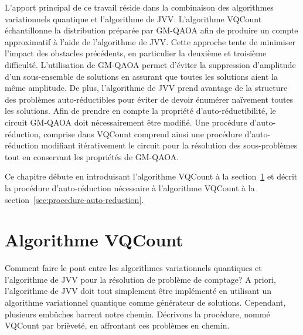 L'apport principal de ce travail réside dans la combinaison des algorithmes variationnels quantique et l'algorithme de JVV. L'algorithme VQCount échantillonne la distribution préparée par GM-QAOA afin de produire un compte approximatif à l'aide de l'algorithme de JVV. Cette approche tente de minimiser l'impact des obstacles précédents, en particulier la deuxième et troisième difficulté. L'utilisation de GM-QAOA permet d'éviter la suppression d'amplitude d'un sous-ensemble de solutions en assurant que toutes les solutions aient la même amplitude. De plus, l'algorithme de JVV prend avantage de la structure des problèmes auto-réductibles pour éviter de devoir énumérer naïvement toutes les solutions. Afin de prendre en compte la propriété d'auto-réductibilité, le circuit GM-QAOA doit nécessairement être modifié. Une procédure d'auto-réduction, comprise dans VQCount comprend ainsi une procédure d'auto-réduction modifiant itérativement le circuit pour la résolution des sous-problèmes tout en conservant les propriétés de GM-QAOA.

Ce chapitre débute en introduisant l'algorithme VQCount à la section~\ref{sec:algorithme-vqcount} et décrit la procédure d'auto-réduction nécessaire à l'algorithme VQCount à la section~\ref{sec:procedure-auto-reduction}.


\section{Algorithme VQCount}
\label{sec:algorithme-vqcount}

Comment faire le pont entre les algorithmes variationnels quantiques et l'algorithme de JVV pour la résolution de problème de comptage? A priori, l'algorithme de JVV doit tout simplement être implémenté en utilisant un algorithme variationnel quantique comme générateur de solutions. Cependant, plusieurs embûches barrent notre chemin. Décrivons la procédure, nommé VQCount par brièveté, en affrontant ces problèmes en chemin.

